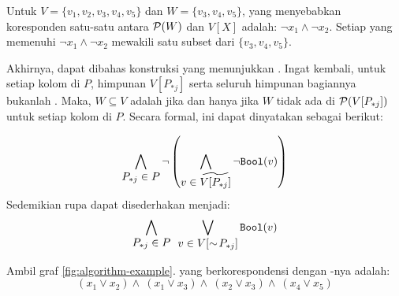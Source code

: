 \begin{example}
	Untuk \(V = \{v_1, v_2, v_3, v_4, v_5\}\) dan \(W = \{v_3, v_4, v_5\}\),  yang menyebabkan koresponden satu-satu antara \(\mathcal{P}(W)\) dan \(V[X]\) adalah: \(\neg x_1 \wedge \neg x_2\). Setiap  yang memenuhi \(\neg x_1 \wedge \neg x_2\) mewakili satu subset dari \(\{v_3, v_4, v_5\}\).
\end{example}

Akhirnya, dapat dibahas konstruksi  yang menunjukkan . Ingat kembali, untuk setiap kolom di \(P\), himpunan \(V[P_{*j}]\) serta seluruh himpunan bagiannya bukanlah . Maka, \(W \subseteq V\) adalah  jika dan hanya jika \(W\) tidak ada di \(\mathcal{P}(V[P_{*j}])\) untuk setiap kolom di \(P\). Secara formal, ini dapat dinyatakan sebagai berikut:

\[
	\bigwedge \limits_{\displaystyle P_{*j} \in P} \neg \left( \bigwedge \limits_{\displaystyle v \in \widetilde{V[P_{*j}]}} \neg \mathtt{Bool}(v) \right)
\]
Sedemikian rupa dapat disederhakan menjadi:
\begin{equation}
	\bigwedge \limits_{\displaystyle P_{*j} \in P} \enspace \bigvee \limits_{\displaystyle v \in V[\sim\!P_{*j}]} \mathtt{Bool}(v)
	\label{eq:boolean-satisfiability-natural}
\end{equation}

\begin{example}
	Ambil graf \autoref{fig:algorithm-example}.  yang berkorespondensi dengan -nya adalah:
		\[
			( x_1 \vee x_2 ) \wedge \ ( x_1 \vee x_3 ) \wedge \ ( x_2 \vee x_3 ) \wedge \ ( x_4 \vee x_5 )
		\]
	\label{ex:boolean-satisfiability-natural}
\end{example}

